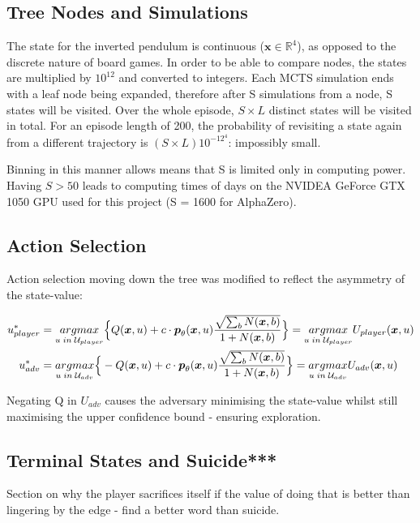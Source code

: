 \documentclass[../main.tex]{subfiles}
\begin{document}
\subsection{Tree Nodes and Simulations}

The state for the inverted pendulum is continuous ($\boldsymbol{x} \in \mathbb{R}^4$), as opposed to the discrete nature of board games. In order to be able to compare nodes, the states are multiplied by $10^{12}$ and converted to integers. Each MCTS simulation ends with a leaf node being expanded, therefore after S simulations from a node, S states will be visited. Over the whole episode, $S\times L$ distinct states will be visited in total. For an episode length of 200, the probability of revisiting a state again from a different trajectory is $(S \times L)10^{-12^4}$: impossibly small.

Binning in this manner allows means that S is limited only in computing power. Having $S>50$ leads to computing times of days on the NVIDEA GeForce GTX 1050 GPU used for this project (S = 1600 for AlphaZero).

\subsection{Action Selection}
Action selection moving down the tree was modified to reflect the asymmetry of the state-value:

{
\newcommand{\bx}{\boldsymbol{x}}
\begin{align}
   u^*_{player} & = \underset{u \; in \; \mathcal{U}_{player}}{argmax} \Big{\{} Q(\bx, u) + c \cdot\boldsymbol{p}_\theta (\bx, u)\frac{\sqrt{\sum_b N(\bx, b)}}{1 + N(\bx, b)}\Big{\}} =  \underset{u \; in \; \mathcal{U}_{player}}{argmax} U_{player}(\bx, u) \\
   u^*_{adv} & = \underset{u \; in \; \mathcal{U}_{adv}}{argmax} \Big{\{} -Q(\bx, u) + c \cdot\boldsymbol{p}_\theta (\bx, u)\frac{\sqrt{\sum_b N(\bx, b)}}{1 + N(\bx, b)}\Big{\}} = \underset{u \; in \; \mathcal{U}_{adv}}{argmax} U_{adv}(\bx, u)
   \label{eqn:IPucb}
\end{align}
}

Negating Q in $U_{adv}$ causes the adversary minimising the state-value whilst still maximising the upper confidence bound - ensuring exploration.

\subsection{Terminal States and Suicide***}
Section on why the player sacrifices itself if the value of doing that is better than lingering by the edge - find a better word than suicide.
\end{document}
